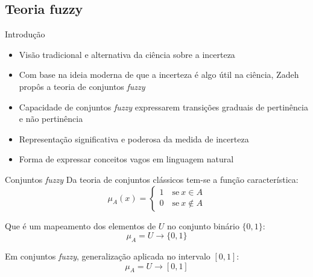 \subsection{Teoria fuzzy}
\begin{frame}{Introdução}
\begin{itemize}
    \item Visão tradicional e alternativa da ciência sobre a incerteza \citep{klir:95}
    \item Com base na ideia moderna de que a incerteza é algo útil na ciência, Zadeh propôs a teoria de conjuntos \emph{fuzzy}
    \item Capacidade de conjuntos \emph{fuzzy} expressarem transições graduais de pertinência e não pertinência
    \item Representação significativa e poderosa da medida de incerteza
    \item Forma de expressar conceitos vagos em linguagem natural
\end{itemize}
\end{frame}

\begin{frame}{Conjuntos \emph{fuzzy}}
Da teoria de conjuntos clássicos tem-se a função característica:
\begin{equation*}
  \mu_A(x) =  \begin{cases}
                1 \quad \text{se}\ x \in A \\
                0 \quad \text{se}\ x \notin A
              \end{cases}
\end{equation*}

Que é um mapeamento dos elementos de $U$ no conjunto binário $\{0, 1\}$:
\begin{equation*}
  \mu_A =  U \rightarrow \{0, 1\}
\end{equation*}


Em conjuntos \emph{fuzzy}, generalização aplicada no intervalo $[0, 1]$:
\begin{equation*}
  \mu_A =  U \rightarrow [0, 1]
\end{equation*}
\end{frame}

